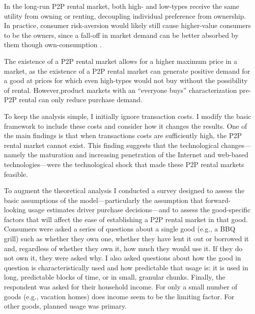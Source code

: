 \documentclass[11pt]{article}
\begin{document}
In the long-run P2P rental market, both high- and low-types receive the same utility from owning or renting, decoupling individual preference from ownership. 
In practice, consumer risk-aversion would likely still cause higher-value consumers to be the owners, since a fall-off in market demand can be better absorbed by them though own-consumption \citep{sinai2005}. 

The existence of a P2P rental market allows for a higher maximum price in a market, as the existence of a P2P rental market can generate positive demand for a good at prices for which even high-types would not buy without the possibility of rental. 
However,product markets with an ``everyone buys'' characterization pre-P2P rental can only reduce purchase demand. 

To keep the analysis simple, I initially ignore transaction costs. 
I modify the basic framework to include these costs and consider how it changes the results. 
One of the main findings is that when transactions costs are sufficiently high, the P2P rental market cannot exist. 
This finding suggests that the technological changes---namely the maturation and increasing penetration of the Internet and web-based technologies---were the technological shock that made these P2P rental markets feasible. 

To augment the theoretical analysis I conducted a survey designed to assess the basic assumptions of the model---particularly the assumption that forward-looking usage estimates driver purchase decisions---and to assess the good-specific factors that will affect the ease of establishing a P2P rental market in that good.
Consumers were asked a series of questions about a single good (e.g., a BBQ grill) such as whether they own one, whether they have lent it out or borrowed it and, regardless of whether they own it, how much they would use it. 
If they do not own it, they were asked why. 
I also asked questions about how the good in question is characteristically used and how predictable that usage is: it is used in long, predictable blocks of time, or in small, granular chunks. 
Finally, the respondent was asked for their household income.  
For only a small number of goods (e.g., vacation homes) does income seem to be the limiting factor. 
For other goods, planned usage was primary.  
\end{document}
